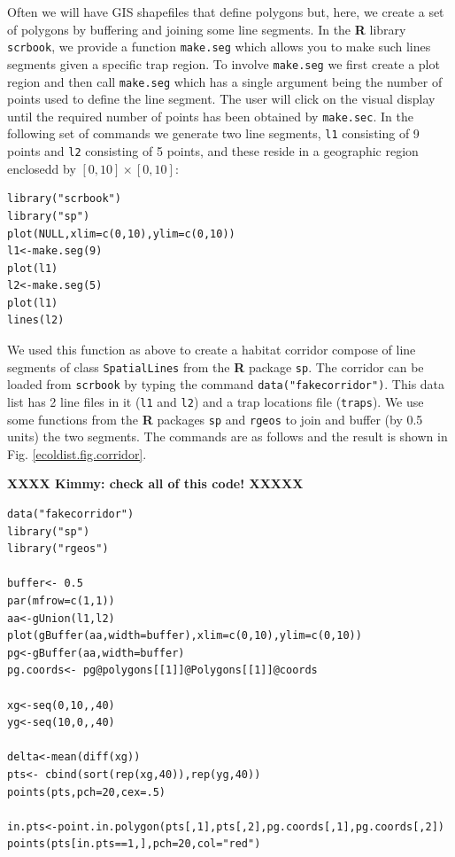 Often we will have GIS shapefiles that define polygons but, here, we
 create a set of polygons by
buffering and joining some line segments.
In the {\bf R} library \mbox{\tt scrbook}, we provide
 a function \mbox{\tt make.seg} which allows you to make such
 lines segments given a
specific trap region.  To involve \mbox{\tt make.seg} we first
create a plot region and then call \mbox{\tt make.seg} which has a
single argument being the number of points used to define the line
segment. The user will click on the visual display until the required
number of points has been obtained by \mbox{\tt make.sec}.
In the following set of commands we generate two line
segments, \mbox{\tt l1} consisting of 9 points and \mbox{\tt l2}
consisting of 5 points, and these reside in a geographic region
enclosedd by $[0,10] \times [0,10]$:
{\small
\begin{verbatim}
library("scrbook")
library("sp")
plot(NULL,xlim=c(0,10),ylim=c(0,10))
l1<-make.seg(9)
plot(l1)
l2<-make.seg(5)
plot(l1)
lines(l2)
\end{verbatim}
}

We used this function as above to create a habitat corridor compose of
line segments of class
\mbox{\tt SpatialLines} from the {\bf R} package \mbox{\tt sp}. The
corridor can be loaded from \mbox{\tt scrbook} by typing the command
\mbox{\tt data("fakecorridor")}.
This data list has 2 line files in it (\mbox{\tt l1} and \mbox{\tt l2}) and a
trap locations file (\mbox{\tt traps}).
We use some functions from the {\bf R} packages \mbox{\tt sp} and
\mbox{\tt rgeos} to join and
buffer (by 0.5 units) the two segments. The commands are as follows
and the result is shown in Fig. \ref{ecoldist.fig.corridor}.

{\bf XXXX Kimmy: check all of this code! XXXXX}

{\small
\begin{verbatim}
data("fakecorridor")
library("sp")
library("rgeos")

buffer<- 0.5
par(mfrow=c(1,1))
aa<-gUnion(l1,l2)
plot(gBuffer(aa,width=buffer),xlim=c(0,10),ylim=c(0,10))
pg<-gBuffer(aa,width=buffer)
pg.coords<- pg@polygons[[1]]@Polygons[[1]]@coords

xg<-seq(0,10,,40)
yg<-seq(10,0,,40)

delta<-mean(diff(xg))
pts<- cbind(sort(rep(xg,40)),rep(yg,40))
points(pts,pch=20,cex=.5)

in.pts<-point.in.polygon(pts[,1],pts[,2],pg.coords[,1],pg.coords[,2])
points(pts[in.pts==1,],pch=20,col="red")
\end{verbatim}
}

